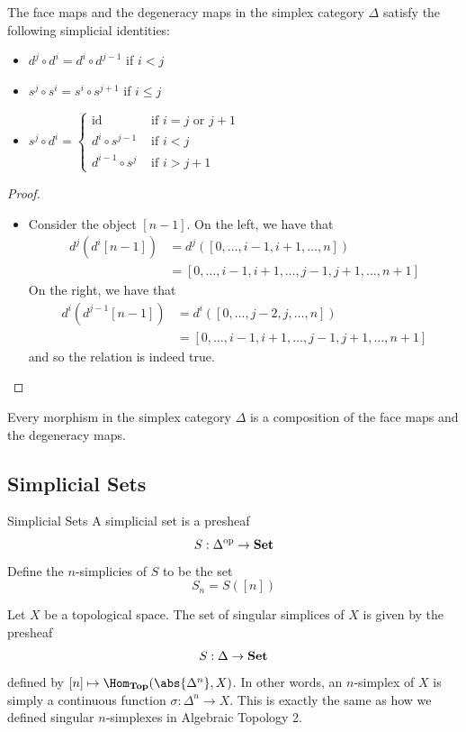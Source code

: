 \documentclass[a4paper]{article}
\begin{document}
\begin{prp}{}{} The face maps and the degeneracy maps in the simplex category $\Delta$ satisfy the following simplicial identities: 
\begin{itemize}
\item $d^j\circ d^i=d^i\circ d^{j-1}$ if $i<j$
\item $s^j\circ s^i=s^i\circ s^{j+1}$ if $i\leq j$
\item $s^j\circ d^i=\begin{cases}
\text{id} & \text{ if } i=j\text{ or }j+1\\
d^i\circ s^{j-1} & \text{ if } i<j\\
d^{i-1}\circ s^j & \text{ if }i>j+1
\end{cases}$
\end{itemize} \tcbline
\begin{proof}~\\
\begin{itemize}
\item Consider the object $[n-1]$. On the left, we have that 
\begin{align*}
d^j(d^i[n-1])&=d^j([0,\dots,i-1,i+1,\dots,n])\\
&=[0,\dots,i-1,i+1,\dots,j-1,j+1,\dots,n+1]
\end{align*}
On the right, we have that
\begin{align*}
d^i(d^{j-1}[n-1])&=d^i([0,\dots,j-2,j,\dots,n])\\
&=[0,\dots,i-1,i+1,\dots,j-1,j+1,\dots,n+1]
\end{align*} and so the relation is indeed true. 
\end{itemize}
\end{proof}
\end{prp}

\begin{prp}{}{} Every morphism in the simplex category $\Delta$ is a composition of the face maps and the degeneracy maps. 
\end{prp}

\subsection{Simplicial Sets}
\begin{defn}{Simplicial Sets}{} A simplicial set is a presheaf $$S:\Delta^\text{op}\to\bold{Set}$$ Define the $n$-simplicies of $S$ to be the set $$S_n=S([n])$$
\end{defn}

\begin{eg}{}{} Let $X$ be a topological space. The set of singular simplices of $X$ is given by the presheaf $$S:\Delta\to\bold{Set}$$ defined by $[n]\mapsto\Hom_\bold{Top}(\abs{\Delta^n},X)$. In other words, an $n$-simplex of $X$ is simply a continuous function $\sigma:\Delta^n\to X$. This is exactly the same as how we defined singular $n$-simplexes in Algebraic Topology 2. 
\end{eg}
\end{document}
